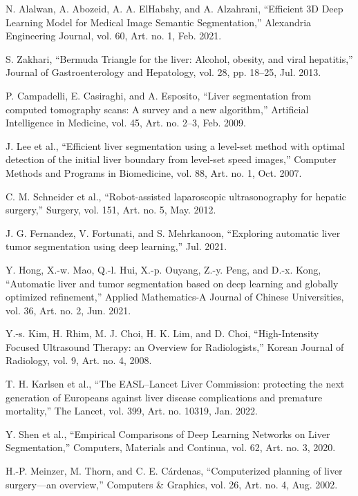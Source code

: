 \documentclass[12pt, a4paper]{article}
\begin{document}
\begin{thebibliography}{99}

N. Alalwan, A. Abozeid, A. A. ElHabshy, and A. Alzahrani, “Efficient 3D Deep Learning Model for Medical Image Semantic Segmentation,” Alexandria Engineering Journal, vol. 60, Art. no. 1, Feb. 2021.

S. Zakhari, “Bermuda Triangle for the liver: Alcohol, obesity, and viral hepatitis,” Journal of Gastroenterology and Hepatology, vol. 28, pp. 18–25, Jul. 2013.

P. Campadelli, E. Casiraghi, and A. Esposito, “Liver segmentation from computed tomography scans: A survey and a new algorithm,” Artificial Intelligence in Medicine, vol. 45, Art. no. 2–3, Feb. 2009.

J. Lee et al., “Efficient liver segmentation using a level-set method with optimal detection of the initial liver boundary from level-set speed images,” Computer Methods and Programs in Biomedicine, vol. 88, Art. no. 1, Oct. 2007.

C. M. Schneider et al., “Robot-assisted laparoscopic ultrasonography for hepatic surgery,” Surgery, vol. 151, Art. no. 5, May. 2012.

J. G. Fernandez, V. Fortunati, and S. Mehrkanoon, “Exploring automatic liver tumor segmentation using deep learning,” Jul. 2021.

Y. Hong, X.-w. Mao, Q.-l. Hui, X.-p. Ouyang, Z.-y. Peng, and D.-x. Kong, “Automatic liver and tumor segmentation based on deep learning and globally optimized refinement,” Applied Mathematics-A Journal of Chinese Universities, vol. 36, Art. no. 2, Jun. 2021.

Y.-s. Kim, H. Rhim, M. J. Choi, H. K. Lim, and D. Choi, “High-Intensity Focused Ultrasound Therapy: an Overview for Radiologists,” Korean Journal of Radiology, vol. 9, Art. no. 4, 2008.

T. H. Karlsen et al., “The EASL–Lancet Liver Commission: protecting the next generation of Europeans against liver disease complications and premature mortality,” The Lancet, vol. 399, Art. no. 10319, Jan. 2022. 

Y. Shen et al., “Empirical Comparisons of Deep Learning Networks on Liver Segmentation,” Computers, Materials and Continua, vol. 62, Art. no. 3, 2020.

H.-P. Meinzer, M. Thorn, and C. E. Cárdenas, “Computerized planning of liver surgery—an overview,” Computers \& Graphics, vol. 26, Art. no. 4, Aug. 2002.


\end{thebibliography}
\end{document}
